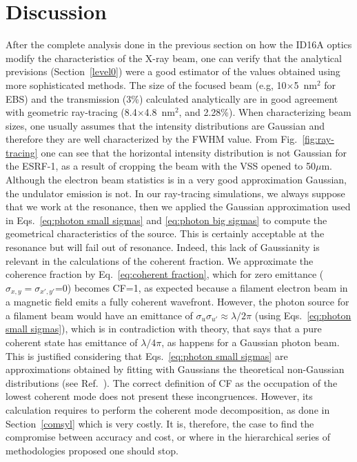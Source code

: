 \documentclass{iucr}              %
\begin{document}
\section{Discussion} 
\label{discussion}

After the complete analysis done in the previous section on how the ID16A optics modify the characteristics of the X-ray beam, one can verify that the analytical previsions (Section~\ref{level0}) were a good estimator of the values obtained using more sophisticated methods. The size of the focused beam (e.g, 10$\times$5~nm$^2$ for EBS) and the transmission (3\%) calculated analytically are in good agreement with geometric ray-tracing (8.4$\times$4.8~nm$^2$, and 2.28\%). When characterizing beam sizes, one usually assumes that the intensity distributions are Gaussian and therefore they are well characterized by the FWHM value. From Fig.~\ref{fig:ray-tracing} one can see that the horizontal intensity distribution is not Gaussian for the ESRF-1, as a result of cropping the beam with the VSS opened to 50$\mu$m. Although the electron beam statistics is in a very good approximation Gaussian, the undulator emission is not. In our ray-tracing simulations, we always suppose that we work at the resonance, then we applied the Gaussian approximation used in Eqs.~\ref{eq:photon small sigmas} and \ref{eq:photon big sigmas} to compute the geometrical characteristics of the source. This is certainly acceptable at the resonance but will fail out of resonance. Indeed, this lack of Gaussianity is relevant in the calculations of the coherent fraction. We approximate the coherence fraction by Eq.~\ref{eq:coherent fraction}, which for zero emittance ($\sigma_{x,y}=\sigma_{x',y'}$=0) becomes CF=1, as expected because a filament electron beam in a magnetic field emits a fully coherent wavefront. However, the photon source for a filament beam would have an emittance of $\sigma_u \sigma_{u'} \approx \lambda / 2 \pi$ (using Eqs.~\ref{eq:photon small sigmas}), which is in contradiction with theory, that says that a pure coherent state has emittance of $\lambda / 4 \pi$, as happens for a Gaussian photon beam. This is justified considering that Eqs.~\ref{eq:photon small sigmas} are approximations obtained by fitting with Gaussians the theoretical non-Gaussian distributions (see Ref.~\cite{elleaume}). The correct definition of CF as the occupation of the lowest coherent mode does not present these incongruences. However, its calculation requires to perform the coherent mode decomposition, as done in Section~\ref{comsyl} which is very costly. It is, therefore, the case to find the compromise between accuracy and cost, or where in the hierarchical series of methodologies proposed one should stop. 
\end{document}
